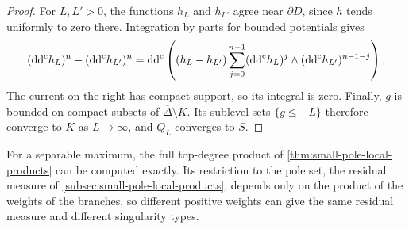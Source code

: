 \begin{proof}
For $L,L'>0$, the functions $h_L$ and $h_{L'}$ agree near $\partial D$, since $h$ tends uniformly to zero there. Integration by parts for bounded potentials gives
\[
 (\mathrm{dd}^{\mathrm{c}} h_L)^n-(\mathrm{dd}^{\mathrm{c}} h_{L'})^n
       =\mathrm{dd}^{\mathrm{c}}\left((h_L-h_{L'})
         \sum_{j=0}^{n-1}(\mathrm{dd}^{\mathrm{c}} h_L)^j
                         \wedge(\mathrm{dd}^{\mathrm{c}} h_{L'})^{n-1-j}\right).
\]
The current on the right has compact support, so its integral is zero.
Finally, $g$ is bounded on compact subsets of $\overline\Delta\setminus K$. Its sublevel sets $\{g\leq-L\}$ therefore converge to $K$ as $L\to\infty$, and $Q_L$ converges to $S$.
\end{proof}

For a separable maximum, the full top-degree product of \cref{thm:small-pole-local-products} can be computed exactly. Its restriction to the pole set, the residual measure of \cref{subsec:small-pole-local-products}, depends only on the product of the weights of the branches, so different positive weights can give the same residual measure and different singularity types.

